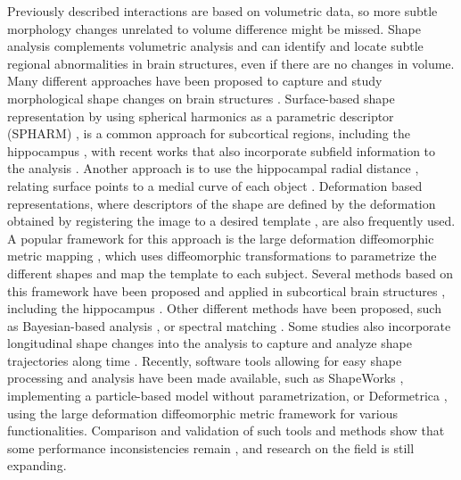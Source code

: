 Previously described interactions are based on volumetric data, so more subtle morphology changes unrelated to volume difference might be missed. Shape analysis complements volumetric analysis and can identify and locate subtle regional abnormalities in brain structures, even if there are no changes in volume. Many different approaches have been proposed to capture and study morphological shape changes on brain structures \cite{Nitzken2014,Zhang2016,Shen2017a}. Surface-based shape representation by using spherical harmonics as a parametric descriptor (SPHARM) \cite{Styner2006}, is a common approach for subcortical regions, including the hippocampus \cite{Shen2003,Styner2004,Shi2007,Zhao2008}, with recent works that also incorporate subfield information to the analysis \cite{Cong2015,Inlow2016}. Another approach is to use the hippocampal radial distance \cite{Thompson2004}, relating surface points to a medial curve of each object \cite{Bouix2005,Morra2009,Apostolova2010,Costafreda2011,Chung2010}. Deformation based representations, where descriptors of the shape are defined by the deformation obtained by registering the image to a desired template \cite{Kim2015a,Joshi2016}, are also frequently used. A popular framework for this approach is the large deformation diffeomorphic metric mapping \cite{Beg2005,Miller2006}, which uses diffeomorphic transformations to parametrize the different shapes and map the template to each subject. Several methods based on this framework have been proposed and applied in subcortical brain structures \cite{Vaillant2007,Durrleman2014,Singh2014,Younes2014,Miller2015,Li2017f}, including the hippocampus \cite{Qiu2009,Tang2016,Cury2018}. Other different methods have been proposed, such as Bayesian-based analysis \cite{Gori2017,Gutierrez2019}, or spectral matching \cite{Shakeri2016a}. Some studies also incorporate longitudinal shape changes into the analysis to capture and analyze shape trajectories along time \cite{Miller2015,Bone2018,Cury2019a}. Recently, software tools allowing for easy shape processing and analysis have been made available, such as ShapeWorks \cite{Cates2017}, implementing a particle-based model without parametrization, or Deformetrica \cite{Bone2018a}, using the large deformation diffeomorphic metric framework for various functionalities. Comparison and validation of such tools and methods show that some performance inconsistencies remain \cite{Madan2017,Gao2014,Goparaju2018}, and research on the field is still expanding. \\

